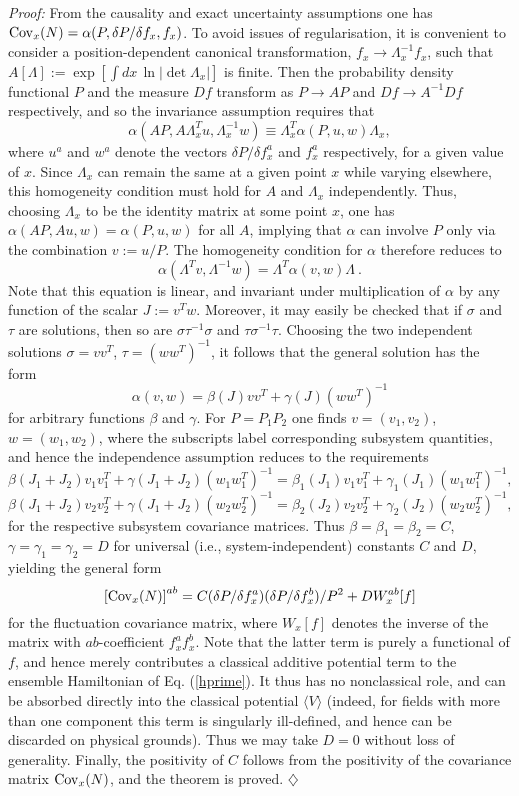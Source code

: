 \documentclass[a4paper,preprint, showpacs, aps, draft]{revtex4}
\begin{document}
{{\it Proof:} From the causality and exact uncertainty assumptions 
one has ${\rm Cov}_x(N) = \alpha(P, \delta P/\delta f_x, f_x)$.  To
avoid issues of regularisation, it is convenient to consider a 
position-dependent canonical transformation, $f_x\rightarrow
\Lambda_x^{-1}f_x$, such that $A[\Lambda]:=\exp[\int dx\,\ln 
|\det\Lambda_x|]$ is
finite. Then the probability density functional  
$P$ and the measure $D\!f$ transform as $P\rightarrow AP$ and
$D\!f\rightarrow A^{-1}D\!f$ respectively, and so the 
invariance assumption requires that
\[
\alpha(AP, A\Lambda_x^Tu, \Lambda_x^{-1}w) \equiv 
\Lambda_x^T\alpha(P,u,w)\Lambda_x , \]
where $u^a$ and $w^a$ denote the vectors $\delta P/\delta f^a_x$ and
$f^a_x$ respectively, for a given value of $x$.
Since $\Lambda_x$ can remain the same at a given point $x$ while varying
elsewhere, this homogeneity condition must hold for $A$ and $\Lambda_x$
independently.  Thus, choosing $\Lambda_x$ to be the identity matrix at
some point $x$, one has $\alpha(AP, Au,w) = \alpha(P,u,w)$ for all $A$,
implying that $\alpha$ can involve $P$ only 
via the combination $v:=u/P$.
The homogeneity condition for $\alpha$ therefore reduces to
\[ 
\alpha(\Lambda^Tv, \Lambda^{-1}w) = \Lambda^T\alpha(v,w)\Lambda~.\]
Note that this equation is linear, and invariant under multiplication of
$\alpha$ by any function of the scalar $J:=v^Tw$.  Moreover, it may
easily be checked that if $\sigma$ and $\tau$ are solutions, then so are
$\sigma \tau^{-1}\sigma$ and $\tau\sigma^{-1}\tau$. Choosing the two
independent solutions $\sigma=vv^T$, $\tau=(ww^T)^{-1}$, it follows that
the general solution has the form
\[
\alpha(v,w) = \beta(J)vv^T + \gamma(J)(ww^T)^{-1} \]
for arbitrary functions $\beta$ and $\gamma$.
For $P=P_1P_2$ one finds $v=(v_1,v_2)$, $w=(w_1,w_2)$, where the
subscripts label corresponding subsystem quantities, and hence the
independence assumption reduces to the requirements
\[
\beta(J_1+J_2)v_1v_1^T + \gamma(J_1+J_2)(w_1w_1^T)^{-1} = 
\beta_1(J_1)v_1v_1^T + \gamma_1(J_1)(w_1w_1^T)^{-1}, \]
\[
\beta(J_1+J_2)v_2v_2^T + \gamma(J_1+J_2)(w_2w_2^T)^{-1} =
\beta_2(J_2)v_2v_2^T + \gamma_2(J_2)(w_2w_2^T)^{-1} ,\] 
for the respective subsystem covariance matrices.
Thus $\beta=\beta_1=\beta_2=C$, $\gamma=\gamma_1=\gamma_2=D$ for 
universal (i.e., system-independent) 
constants $C$ and $D$, yielding the general form
\[
\left[{\rm Cov}_x(N)\right]^{ab} = C (\delta P/\delta f^a_x) (\delta
P/\delta f^b_x)/P^2 + D W^{ab}_x[f] \]
for the fluctuation covariance matrix, where $W_x[f]$ denotes the inverse of
the matrix with ${ab}$-coefficient $f^a_xf^b_x$. Note that
the latter term is
purely a functional of $f$, and hence merely contributes a classical
additive potential term to the ensemble Hamiltonian of Eq. (\ref{hprime}).  It
thus has no nonclassical role, and can be absorbed directly into the
classical potential $\langle V\rangle$ (indeed, for fields with more than one
component this term is singularly ill-defined, and hence can be
discarded on physical grounds).  Thus we may take $D=0$ without loss of
generality. Finally, the positivity of $C$ follows from the positivity
of the covariance matrix ${\rm Cov}_x(N)$, and the theorem is proved. 
$\diamondsuit$ 

}
\end{document}
